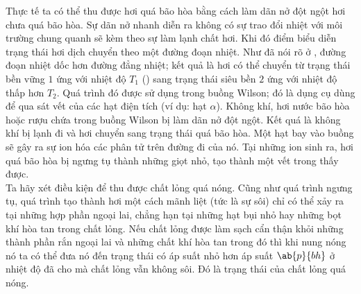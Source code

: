 Thực tế ta có thể thu được hơi quá bão hòa bằng cách làm dãn nở đột ngột hơi chưa quá bão hòa. Sự dãn nở nhanh diễn ra không có sự trao đổi nhiệt với môi trường chung quanh sẽ kèm theo sự làm lạnh chất hơi. Khi đó điểm biểu diễn trạng thái hơi dịch chuyển theo một đường đoạn nhiệt. Như đã nói rõ ở , đường đoạn nhiệt dốc hơn đường đẳng nhiệt; kết quả là hơi có thể chuyển từ trạng thái bền vững $1$ ứng với nhiệt độ $T_1$ () sang trạng thái siêu bền $2$ ứng với nhiệt độ thấp hơn $T_2$. Quá trình đó được sử dụng trong buồng Wilson; đó là dụng cụ dùng để qua sát vết của các hạt điện tích (ví dụ: hạt $\alpha$). Không khí, hơi nước bão hòa hoặc rượu chứa trong buồng Wilson bị làm dãn nở đột ngột. Kết quá là không khí bị lạnh đi và hơi chuyển sang trạng thái quá bão hòa. Một hạt bay vào buồng sẽ gây ra sự ion hóa các phân tử trên đường đi của nó. Tại những ion sinh ra, hơi quá bão hòa bị ngưng tụ thành những giọt nhỏ, tạo thành một vết trong thấy được.\\

Ta hãy xét điều kiện để thu được chất lỏng quá nóng. Cũng như quá trình ngưng tụ, quá trình tạo thành hơi một cách mãnh liệt (tức là sự sôi) chỉ có thể xảy ra tại những hợp phần ngoại lai, chẳng hạn tại những hạt bụi nhỏ hay những bọt khí hòa tan trong chất lỏng. Nếu chất lỏng được làm sạch cẩn thận khỏi những thành phần rắn ngoại lai và những chất khí hòa tan trong đó thì khi nung nóng nó ta có thể đưa nó đến trạng thái có áp suất nhỏ hơn áp suất $\ab{p}{bh}$ ở nhiệt độ đã cho mà chất lỏng vẫn không sôi. Đó là trạng thái của chất lỏng quá nóng.\\

